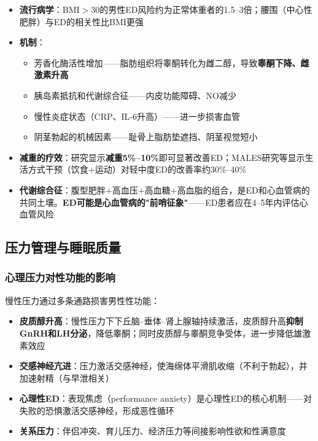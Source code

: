 \begin{itemize}[leftmargin=2cm]
	\item \textbf{流行病学}：BMI$>$30的男性ED风险约为正常体重者的1.5--3倍；腰围（中心性肥胖）与ED的相关性比BMI更强
	\item \textbf{机制}：
    \begin{itemize}
    	\item 芳香化酶活性增加——脂肪组织将睾酮转化为雌二醇，导致\textbf{睾酮下降、雌激素升高}
    	\item 胰岛素抵抗和代谢综合征——内皮功能障碍、NO减少
    	\item 慢性炎症状态（CRP、IL-6升高）——进一步损害血管
    	\item 阴茎勃起的机械因素——耻骨上脂肪垫遮挡、阴茎视觉短小
    \end{itemize}
	\item \textbf{减重的疗效}：研究显示\textbf{减重5\%--10\%}即可显著改善ED；MALES研究等显示生活方式干预（饮食+运动）对轻中度ED的改善率约30\%--40\%
	\item \textbf{代谢综合征}：腹型肥胖+高血压+高血糖+高血脂的组合，是ED和心血管病的共同土壤。\textbf{ED可能是心血管病的"前哨征象"}——ED患者应在4--5年内评估心血管风险
\end{itemize}

\subsection{压力管理与睡眠质量}

\subsubsection{心理压力对性功能的影响}

慢性压力通过多条通路损害男性性功能：

\begin{itemize}[leftmargin=2cm]
	\item \textbf{皮质醇升高}：慢性压力下下丘脑--垂体--肾上腺轴持续激活，皮质醇升高\textbf{抑制GnRH和LH分泌}，降低睾酮；同时皮质醇与睾酮竞争受体，进一步降低雄激素效应
	\item \textbf{交感神经亢进}：压力激活交感神经，使海绵体平滑肌收缩（不利于勃起），并加速射精（与早泄相关）
	\item \textbf{心理性ED}：表现焦虑（performance anxiety）是心理性ED的核心机制——对失败的恐惧激活交感神经，形成恶性循环
	\item \textbf{关系压力}：伴侣冲突、育儿压力、经济压力等间接影响性欲和性满意度
\end{itemize}

